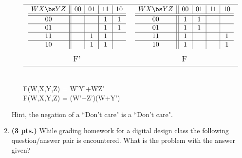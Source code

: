 \begin{enumerate}
\begin{enumerate}
\begin{onlysolution}
{                        \begin{tabular}{cc}
                            $
                            \begin{array} {c||c|c|c|c}
                                W X \bs Y Z   & 00 & 01 & 11 & 10 \\ \hline \hline
                                00        &    &    & 1  & 1  \\ \hline
                                01        &    &    & 1  & 1  \\ \hline
                                11        &    & 1  & 1  &    \\ \hline
                                10        &    & 1  & 1  &    \\
                            \end{array}$ &
                            $
                            \begin{array} {c||c|c|c|c}
                                W X \bs Y Z   & 00 & 01 & 11 & 10 \\ \hline \hline
                                00        & 1  & 1  &    &    \\ \hline
                                01        & 1  & 1  &    &    \\ \hline
                                11        & 1  &    &    & 1  \\ \hline
                                10        & 1  &    &    & 1  \\
                            \end{array}$ \\
                            F'  & F \\
                        \end{tabular} \\
                        \SOPmin F(W,X,Y,Z) =  W'Y'+WZ'\\
                        \POSmin F(W,X,Y,Z) = (W'+Z')(W+Y')
                    }
                \end{onlysolution}
        \end{enumerate}
        Hint, the negation of a ``Don't care" is a ``Don't care".

    \item \textbf{ (3 pts.)} While grading homework for a digital design class
        the following question/answer pair is encountered.  What is
        the problem with the answer given?


\end{enumerate}
